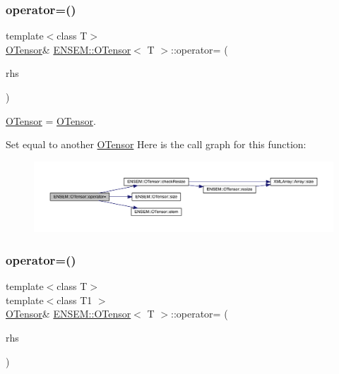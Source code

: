 \subsubsection{\texorpdfstring{operator=()}{operator=()}\hspace{0.1cm}{\footnotesize\ttfamily [9/12]}}
{\footnotesize\ttfamily template$<$class T$>$ \\
\mbox{\hyperlink{classENSEM_1_1OTensor}{O\+Tensor}}\& \mbox{\hyperlink{classENSEM_1_1OTensor}{E\+N\+S\+E\+M\+::\+O\+Tensor}}$<$ T $>$\+::operator= (\begin{DoxyParamCaption}\item[{const \mbox{\hyperlink{classENSEM_1_1OTensor}{O\+Tensor}}$<$ T $>$ \&}]{rhs }\end{DoxyParamCaption})\hspace{0.3cm}{\ttfamily [inline]}}



\mbox{\hyperlink{classENSEM_1_1OTensor}{O\+Tensor}} = \mbox{\hyperlink{classENSEM_1_1OTensor}{O\+Tensor}}. 

Set equal to another \mbox{\hyperlink{classENSEM_1_1OTensor}{O\+Tensor}} Here is the call graph for this function\+:
\nopagebreak
\begin{figure}[H]
\begin{center}
\leavevmode
\includegraphics[width=350pt]{da/d8a/classENSEM_1_1OTensor_a08690a1808269fccd113a9d634c7a73f_cgraph}
\end{center}
\end{figure}
\mbox{\label{classENSEM_1_1OTensor_a96fac7277ac1df849789d53b761e5e68}} 
\subsubsection{\texorpdfstring{operator=()}{operator=()}\hspace{0.1cm}{\footnotesize\ttfamily [10/12]}}
{\footnotesize\ttfamily template$<$class T$>$ \\
template$<$class T1 $>$ \\
\mbox{\hyperlink{classENSEM_1_1OTensor}{O\+Tensor}}\& \mbox{\hyperlink{classENSEM_1_1OTensor}{E\+N\+S\+E\+M\+::\+O\+Tensor}}$<$ T $>$\+::operator= (\begin{DoxyParamCaption}\item[{const \mbox{\hyperlink{classENSEM_1_1OTensor}{O\+Tensor}}$<$ T1 $>$ \&}]{rhs }\end{DoxyParamCaption})\hspace{0.3cm}{\ttfamily [inline]}}



